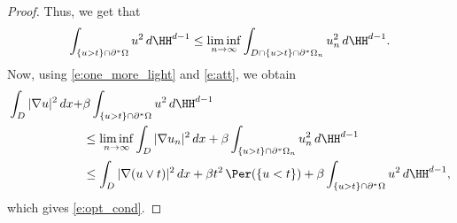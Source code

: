 \begin{proof}
Thus, we get that
\begin{equation}\label{e:one_more_light}
\int_{\{u>t\}\cap \partial^\ast\Omega}u^2\,d\HH^{d-1}\le \liminf_{n\to\infty}\int_{D\cap\{u>t\}\cap \partial^\ast\Omega_{n}}u_{n}^2\,d\HH^{d-1}.
\end{equation}
Now, using \eqref{e:one_more_light} and \eqref{e:att}, we obtain
\begin{align}
\int_{D}|\nabla u|^2\,dx+&\beta\int_{\{u> t\}\cap \partial^\ast\Omega}u^2\,d\HH^{d-1}\notag\\
&\le \liminf_{n\to\infty}\int_{D}|\nabla u_{n}|^2\,dx+\beta\int_{\{u> t\}\cap \partial^\ast\Omega_{n}}u_{n}^2\,d\HH^{d-1}\notag\\
&\le \int_{D}|\nabla (u\vee t)|^2\,dx+\beta t^2\, \Per(\{u<t\})+\beta\int_{\{u> t\}\cap \partial^\ast\Omega}u^2\,d\HH^{d-1},\notag
\end{align}
which gives \eqref{e:opt_cond}.
\end{proof}

